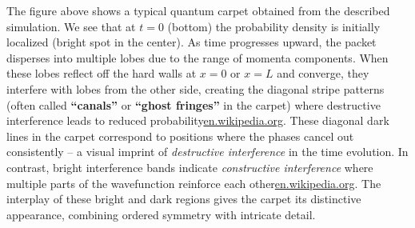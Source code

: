 \documentclass[11pt,a4paper]{article}
\begin{document}
The figure above shows a typical quantum carpet obtained from the described simulation. We see that at $t=0$ (bottom) the probability density is initially localized (bright spot in the center). As time progresses upward, the packet disperses into multiple lobes due to the range of momenta components. When these lobes reflect off the hard walls at $x=0$ or $x=L$ and converge, they interfere with lobes from the other side, creating the diagonal stripe patterns (often called \textbf{“canals”} or \textbf{“ghost fringes”} in the carpet) where destructive interference leads to reduced probability\href{https://en.wikipedia.org/wiki/Quantum_carpet#:~:text=,properties of waves in addition}{en.wikipedia.org}. These diagonal dark lines in the carpet correspond to positions where the phases cancel out consistently – a visual imprint of \emph{destructive interference} in the time evolution. In contrast, bright interference bands indicate \emph{constructive interference} where multiple parts of the wavefunction reinforce each other\href{https://en.wikipedia.org/wiki/Quantum_carpet#:~:text=,properties of waves in addition}{en.wikipedia.org}. The interplay of these bright and dark regions gives the carpet its distinctive appearance, combining ordered symmetry with intricate detail.
\end{document}
